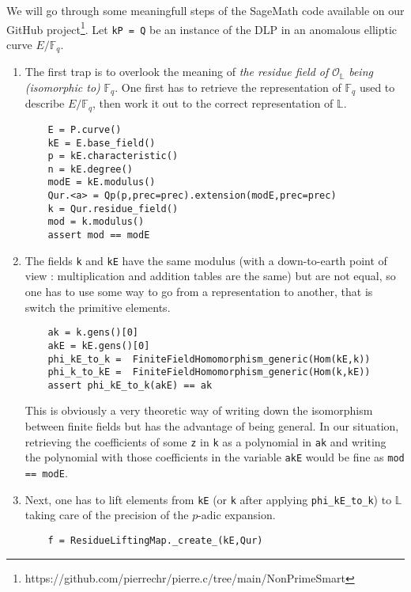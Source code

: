\documentclass[10pt]{article}
\theoremstyle{definition}
\newcommand{\F}{\mathbb{F}}
\renewcommand{\L}{\mathbb{L}}
\begin{document}
We will go through some meaningfull steps of the SageMath code available on our GitHub project\footnote{https://github.com/pierrechr/pierre.c/tree/main/NonPrimeSmart}.
Let \verb|kP = Q| be an instance of the DLP in an anomalous elliptic curve $E/\F_q$.
\begin{enumerate}
\item  The first trap is to overlook the meaning of \textsl{ the residue field of } $\mathcal{O}_{\L}$ \textsl{being (isomorphic to)} $\F_q$.
One first has to retrieve the representation of $\F_q$ used to describe $E/\F_q$, then work it out to the correct representation of $\L$.

\begin{verbatim}
    E = P.curve()
    kE = E.base_field()
    p = kE.characteristic()
    n = kE.degree()
    modE = kE.modulus()
    Qur.<a> = Qp(p,prec=prec).extension(modE,prec=prec)
    k = Qur.residue_field()
    mod = k.modulus()
    assert mod == modE
\end{verbatim}

\item The fields \verb|k|  and \verb|kE| have the same modulus (with a down-to-earth point of view : multiplication and addition tables are the same) but are not equal, so one has to use some way to go from a representation to another, that is switch the primitive elements. 

\begin{verbatim}
    ak = k.gens()[0]
    akE = kE.gens()[0]
    phi_kE_to_k =  FiniteFieldHomomorphism_generic(Hom(kE,k))
    phi_k_to_kE =  FiniteFieldHomomorphism_generic(Hom(k,kE))
    assert phi_kE_to_k(akE) == ak
\end{verbatim}

This is obviously a very theoretic way of writing down the isomorphism between finite fields but has the advantage of being general.
In our situation, retrieving the coefficients of some \verb|z| in \verb|k| as a polynomial in \verb|ak| and writing the polynomial with those coefficients in the variable \verb|akE| would be fine as \verb|mod == modE|. 

\item Next, one has to lift elements from \verb|kE| (or \verb|k| after applying \verb|phi_kE_to_k|) to $\L$ taking care of the precision of the $p$-adic expansion.

\begin{verbatim}
    f = ResidueLiftingMap._create_(kE,Qur)
\end{verbatim}


\end{enumerate}
\end{document}
